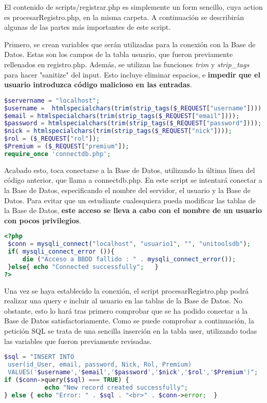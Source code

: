 \documentclass[12pt]{report}
\begin{document}
El contenido de scripts/registrar.php es simplemente un form sencillo, cuya action es procesarRegistro.php, en la misma carpeta. A continuación se describirán algunas de las partes más importantes de este script.

Primero, se crean variables que serán utilizadas para la conexión con la Base de Datos. Estas son los campos de la tabla usuario, que fueron previamente rellenados en registro.php. Además, se utilizan las funciones \textit{trim} y \textit{strip\_tags} para hacer "sanitize" del input. Esto incluye eliminar espacios, e \textbf{impedir que el usuario introduzca código malicioso en las entradas}.
\newline
\begin{lstlisting}[language=PHP]
$servername = "localhost";
$username =  htmlspecialchars(trim(strip_tags($_REQUEST["username"])));
$email = htmlspecialchars(trim(strip_tags($_REQUEST["email"])));
$password = htmlspecialchars(trim(strip_tags($_REQUEST["password"])));
$nick = htmlspecialchars(trim(strip_tags($_REQUEST["nick"])));
$rol = ($_REQUEST["rol"]);
$Premium = ($_REQUEST["premium"]);
require_once 'connectdb.php';
\end{lstlisting}

Acabado esto, toca conectarse a la Base de Datos, utilizando la última línea del código anterior, que llama a connectdb.php. En este script se intentará conectar a la Base de Datos,
especificando el nombre del servidor, el usuario y la Base de Datos. Para evitar que un estudiante cualesquiera pueda modificar las tablas de la Base de Datos, \textbf{este acceso se lleva a cabo con el nombre de un usuario con pocos privilegios}.
\newline
\begin{lstlisting}[language=PHP]
<?php
 $conn = mysqli_connect("localhost", "usuario1", "", "unitoolsdb");
 if( mysqli_connect_error ()){
     die ("Acceso a BBDD fallido : " . mysqli_connect_error());
 }else{ echo "Connected successfully";   }
?>
\end{lstlisting}
Una vez se haya establecido la conexión, el script procesarRegistro.php podrá realizar una query e incluir al usuario en las tablas de la Base de Datos. No obstante, esto lo hará tras primero comprobar que se ha podido conectar a la Base de Datos satisfactoriamente. Como se puede comprobar a continuación, la petición SQL se trata de una sencilla inserción en la tabla user, utilizando todas las variables que fueron previamente revisadas.

\begin{lstlisting}[language=PHP]
$sql = "INSERT INTO 
 user(id_User, email, password, Nick, Rol, Premium) 
 VALUES('$username','$email','$password','$nick','$rol','$Premium')";
if ($conn->query($sql) === TRUE) {
           echo "New record created successfully";
} else { echo "Error: " . $sql . "<br>" . $conn->error;  }  
\end{lstlisting}
\end{document}
